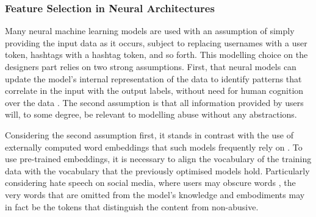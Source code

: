 \subsubsection{Feature Selection in Neural Architectures}
Many neural machine learning models are used with an assumption of simply providing the input data as it occurs, subject to replacing usernames with a user token, hashtags with a hashtag token, and so forth.
This modelling choice on the designers part relies on two strong assumptions. 
First, that neural models can  update the model's internal representation of the data  to identify patterns that correlate in the input  with the output labels, without  need for human cognition  over the data .
The second assumption is that all information provided by users will, to some degree, be relevant to modelling abuse without any abstractions.

Considering the second assumption first, it stands in contrast with the use of externally computed word embeddings that such models frequently rely on \citep{Kshirsagar:2018,Isaksen:2020}.
To use pre-trained embeddings, it is necessary to align the vocabulary of the training data with the vocabulary that the previously optimised models hold.
Particularly considering hate speech on social media, where users may  obscure words  \citep{Rottger:2021}, the very words that are omitted from the model's knowledge and embodiments may in fact be the tokens that distinguish the  content from non-abusive.

